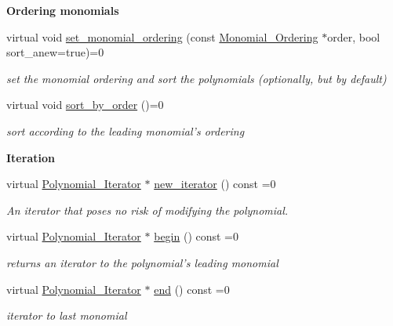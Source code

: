 \begin{Indent}\textbf{ Ordering monomials}\par
\begin{DoxyCompactItemize}
\item 
virtual void \hyperlink{group__polygroup_a12e023570eb675343c4b7ed635a031dc}{set\+\_\+monomial\+\_\+ordering} (const \hyperlink{group__orderinggroup_class_monomial___ordering}{Monomial\+\_\+\+Ordering} $\ast$order, bool sort\+\_\+anew=true)=0
\begin{DoxyCompactList}\small\item\em set the monomial ordering and sort the polynomials (optionally, but by default) \end{DoxyCompactList}\item 
virtual void \hyperlink{group__polygroup_a1fcdd29c324c660ea935197c39e682f2}{sort\+\_\+by\+\_\+order} ()=0
\begin{DoxyCompactList}\small\item\em sort according to the leading monomial's ordering \end{DoxyCompactList}\end{DoxyCompactItemize}
\end{Indent}
\begin{Indent}\textbf{ Iteration}\par
\begin{DoxyCompactItemize}
\item 
\mbox{\label{group__polygroup_a9cb8460694b7fceaa5a22ae58c73ebe7}} 
virtual \hyperlink{group___iterator_group_class_polynomial___iterator}{Polynomial\+\_\+\+Iterator} $\ast$ \hyperlink{group__polygroup_a9cb8460694b7fceaa5a22ae58c73ebe7}{new\+\_\+iterator} () const =0
\begin{DoxyCompactList}\small\item\em An iterator that poses no risk of modifying the polynomial. \end{DoxyCompactList}\item 
\mbox{\label{group__polygroup_ad8da27c2d5e41d6e81d15d756eebf868}} 
virtual \hyperlink{group___iterator_group_class_polynomial___iterator}{Polynomial\+\_\+\+Iterator} $\ast$ \hyperlink{group__polygroup_ad8da27c2d5e41d6e81d15d756eebf868}{begin} () const =0
\begin{DoxyCompactList}\small\item\em returns an iterator to the polynomial's leading monomial \end{DoxyCompactList}\item 
\mbox{\label{group__polygroup_aa769b074a39e5eac6526101d77e2e53f}} 
virtual \hyperlink{group___iterator_group_class_polynomial___iterator}{Polynomial\+\_\+\+Iterator} $\ast$ \hyperlink{group__polygroup_aa769b074a39e5eac6526101d77e2e53f}{end} () const =0
\begin{DoxyCompactList}\small\item\em iterator to last monomial \end{DoxyCompactList}\end{DoxyCompactItemize}
\end{Indent}
